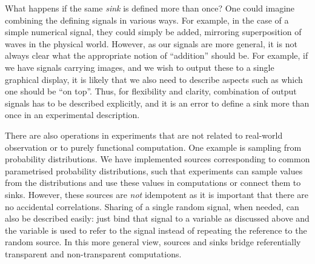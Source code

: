 \documentclass[11pt]{article}
\begin{document}
What happens if the same \emph{sink} is defined more than once? One could
imagine combining the defining signals in various ways. For example, in the
case of a simple numerical signal, they could simply be added, mirroring
superposition of waves in the physical world. However, as our signals are more
general, it is not always clear what the appropriate notion of ``addition''
should be. For example, if we have signals carrying images, and we wish to
output these to a single graphical display, it is likely that we also need to
describe aspects such as which one should be ``on top''. Thus, for flexibility
and clarity, combination of output signals has to be described explicitly, and
it is an error to define a sink more than once in an experimental description.

There are also operations in experiments that are not related to real-world
observation or to purely functional computation. One example is sampling from
probability distributions. We have implemented sources corresponding to common
parametrised probability distributions, such that experiments can sample
values from the distributions and use these values in computations or
connect them to sinks. However, these sources are \emph{not} idempotent as it
is important that there are no accidental correlations. Sharing of a single random
signal, when needed, can also be described easily: just bind that signal to a
variable as discussed above and the variable is used to refer to the signal
instead of repeating the reference to the random source. In this more general
view, sources and sinks bridge referentially transparent and non-transparent
computations.

\end{document}
